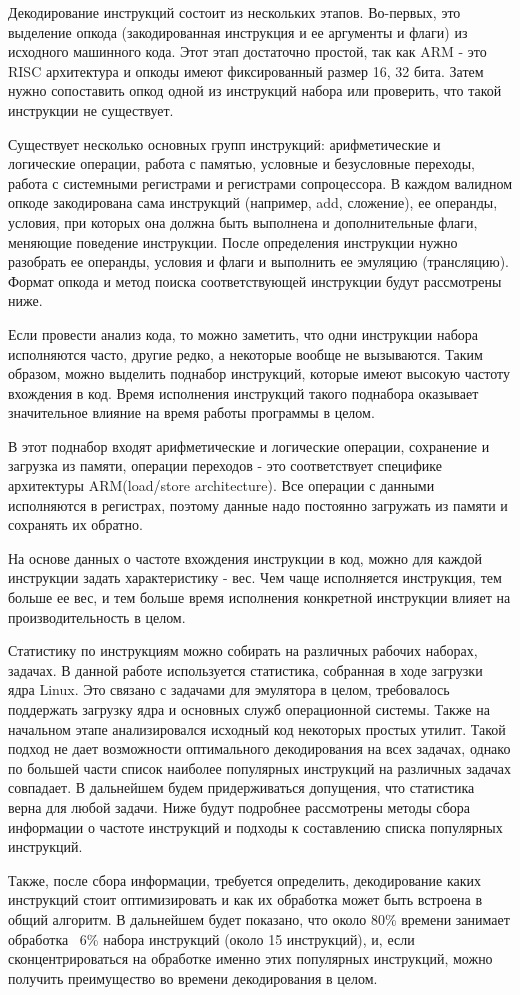 Декодирование инструкций состоит из нескольких этапов. Во-первых, это выделение опкода (закодированная инструкция и ее аргументы и флаги) из исходного машинного кода. Этот этап достаточно простой, так как ARM - это RISC архитектура и опкоды имеют фиксированный размер 16, 32 бита. Затем нужно сопоставить опкод одной из инструкций набора или проверить, что такой инструкции не существует.

Существует несколько основных групп инструкций: арифметические и логические операции, работа с памятью, условные и безусловные переходы, работа с системными регистрами и регистрами сопроцессора. В каждом валидном опкоде закодирована сама инструкций (например, add, сложение), ее операнды, условия, при которых она должна быть выполнена и дополнительные флаги, меняющие поведение инструкции.  После определения инструкции нужно разобрать ее операнды, условия и флаги и выполнить ее эмуляцию (трансляцию). Формат опкода и метод поиска соответствующей инструкции будут рассмотрены ниже.

Если провести анализ кода, то можно заметить, что одни инструкции набора исполняются часто, другие редко, а некоторые вообще не вызываются. Таким образом, можно выделить поднабор инструкций, которые имеют высокую частоту вхождения в код. Время исполнения инструкций такого поднабора оказывает  значительное влияние на время работы программы в целом.

В этот поднабор входят арифметические и логические операции, сохранение и загрузка из памяти, операции переходов - это соответствует специфике архитектуры ARM(load/store architecture). Все операции с данными исполняются в регистрах, поэтому данные надо постоянно загружать из памяти и сохранять их обратно.

На основе данных о частоте вхождения инструкции в код, можно для каждой инструкции задать характеристику - вес. Чем чаще исполняется инструкция, тем больше ее вес, и тем больше время исполнения конкретной инструкции влияет на производительность в целом.

Статистику по инструкциям можно собирать на различных рабочих наборах, задачах. В данной работе используется статистика, собранная в ходе загрузки ядра Linux. Это связано с задачами для эмулятора в целом, требовалось поддержать загрузку ядра и основных служб операционной системы. Также на начальном этапе анализировался исходный код некоторых простых утилит. Такой подход не дает возможности оптимального декодирования на всех задачах, однако по большей части список наиболее популярных инструкций на различных задачах совпадает. В дальнейшем будем придерживаться допущения, что статистика верна для любой задачи. Ниже будут подробнее рассмотрены методы сбора информации о частоте инструкций и подходы к составлению списка популярных инструкций.

Также, после сбора информации, требуется определить, декодирование каких инструкций стоит оптимизировать и как их обработка может быть встроена в общий алгоритм. В дальнейшем будет показано, что около 80\% времени занимает обработка ~6\% набора инструкций (около 15 инструкций), и, если сконцентрироваться на обработке именно этих популярных инструкций, можно получить преимущество во времени декодирования в целом.  